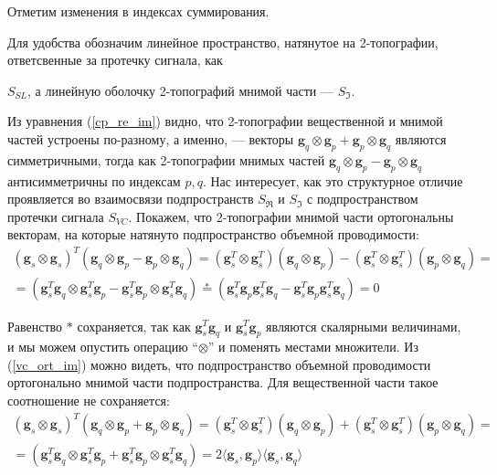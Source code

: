 Отметим изменения в индексах суммирования.

Для удобства обозначим линейное пространство, натянутое на 2-топографии, ответсвенные за протечку сигнала, как


$S_{SL}$, а линейную оболочку 2-топографий мнимой части --- $S_{\Im}$.

Из уравнения (\ref{cp_re_im}) видно, что 2-топографии вещественной и мнимой частей устроены по-разному,
а именно, --- векторы $\mathbf{g}_q \otimes \mathbf{g}_p + \mathbf{g}_p \otimes \mathbf{g}_q$ являются симметричными, тогда как 2-топографии мнимых частей $\mathbf{g}_q \otimes \mathbf{g}_p - \mathbf{g}_p \otimes \mathbf{g}_q$ антисимметричны по индексам $p, q$. Нас интересует, как это структурное отличие проявляется во взаимосвязи подпространств $S_{\Re}$ и $S_{\Im}$ с подпространством протечки сигнала $S_{VC}$. Покажем, что  2-топографии мнимой части ортогональны векторам, на которые натянуто подпространство объемной проводимости: 
\begin{gather}
    (\mathbf{g}_s \otimes \mathbf{g}_s)^T(\mathbf{g}_q \otimes \mathbf{g}_p - \mathbf{g}_p \otimes \mathbf{g}_q) =  
        (\mathbf{g}_s^T \otimes \mathbf{g}_s^T)(\mathbf{g}_q \otimes \mathbf{g}_p) -
        (\mathbf{g}_s^T \otimes \mathbf{g}_s^T)(\mathbf{g}_p \otimes \mathbf{g}_q) = \nonumber \\ 
       =(\mathbf{g}_s^T \mathbf{g}_q \otimes \mathbf{g}_s^T \mathbf{g}_p - 
         \mathbf{g}_s^T \mathbf{g}_p \otimes \mathbf{g}_s^T \mathbf{g}_q) \stackrel{*}{=}
        (\mathbf{g}_s^T \mathbf{g}_p \mathbf{g}_s^T \mathbf{g}_q - 
         \mathbf{g}_s^T \mathbf{g}_p \mathbf{g}_s^T \mathbf{g}_q) = 0
         \label{vc_ort_im}
\end{gather}

Равенство $*$ сохраняется, так как $\mathbf{g}^T_s \mathbf{g}_q$ и $\mathbf{g}_s^T \mathbf{g}_p$ являются скалярными величинами, и мы можем опустить операцию ``$\otimes$'' и поменять местами множители.
Из (\ref{vc_ort_im}) можно видеть,
что подпространство объемной проводимости ортогонально мнимой части подпространства.
Для вещественной части такое соотношение не сохраняется:
\begin{gather}
    (\mathbf{g}_s \otimes \mathbf{g}_s)^T(\mathbf{g}_q \otimes \mathbf{g}_p + \mathbf{g}_p \otimes \mathbf{g}_q) =  
        (\mathbf{g}_s^T \otimes \mathbf{g}_s^T)(\mathbf{g}_q \otimes \mathbf{g}_p) +
        (\mathbf{g}_s^T \otimes \mathbf{g}_s^T)(\mathbf{g}_p \otimes \mathbf{g}_q) = \nonumber \\ 
       =(\mathbf{g}_s^T \mathbf{g}_q \otimes \mathbf{g}_s^T \mathbf{g}_p + 
         \mathbf{g}_s^T \mathbf{g}_p \otimes \mathbf{g}_s^T \mathbf{g}_q) =
        2\langle\mathbf{g}_s, \mathbf{g}_p\rangle \langle\mathbf{g}_s, \mathbf{g}_q\rangle
         \label{vc_ort_re}
\end{gather}

